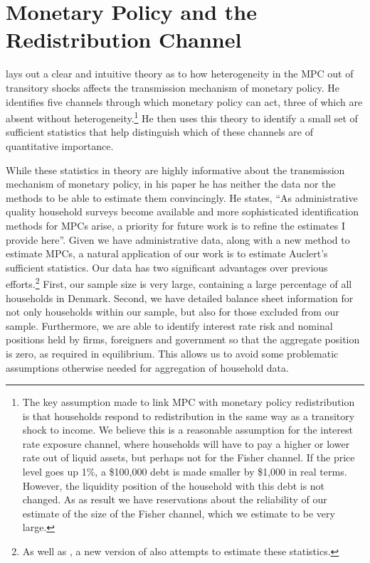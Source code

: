 \documentclass[titlepage]{\econtex}\newcommand{\texname}{ConsumptionHeterogeneity}
\begin{document}
\section{Monetary Policy and the Redistribution Channel} \label{monetary_policy}
\cite{auclert_monetary_2017} lays out a clear and intuitive theory as to how heterogeneity in the MPC out of transitory shocks affects the transmission mechanism of monetary policy. He identifies five channels through which monetary policy can act, three of which are absent without heterogeneity.\footnote{The key assumption made to link MPC with monetary policy redistribution is that households respond to redistribution in the same way as a transitory shock to income. We believe this is a reasonable assumption for the interest rate exposure channel, where households will have to pay a higher or lower rate out of liquid assets, but perhaps not for the Fisher channel. If the price level goes up 1\%, a \$100,000 debt is made smaller by \$1,000 in real terms. However, the liquidity position of the household with this debt is not changed. As as result we have reservations about the reliability of our estimate of the size of the Fisher channel, which we estimate to be very large.} He then uses this theory to identify a small set of sufficient statistics that help distinguish which of these channels are of quantitative importance.

While these statistics in theory are highly informative about the transmission mechanism of monetary policy, in his paper he has neither the data nor the methods to be able to estimate them convincingly. He states, ``As administrative quality household surveys become available and more sophisticated identification methods for MPCs arise, a priority for future work is to refine the estimates I provide here''. Given we have administrative data, along with a new method to estimate MPCs, a natural application of our work is to estimate Auclert's sufficient statistics. Our data has two significant advantages over previous efforts.\footnote{As well as \cite{auclert_monetary_2017}, a new version of \cite{fagereng_mpc_2016} also attempts to estimate these statistics.} First, our sample size is very large, containing a large percentage of all households in Denmark. Second, we have detailed balance sheet information for not only households within our sample, but also for those excluded from our sample. Furthermore, we are able to identify interest rate risk and nominal positions held by firms, foreigners and government so that the aggregate position is zero, as required in equilibrium. This allows us to avoid some problematic assumptions otherwise needed for aggregation of household data.
\end{document}
